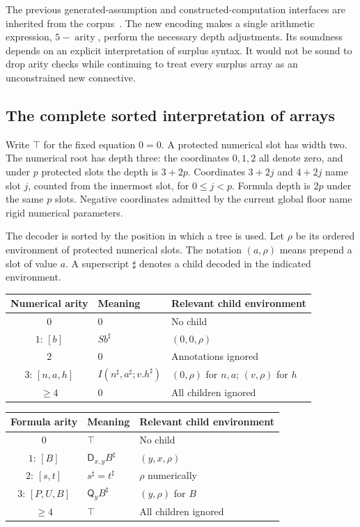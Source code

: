 \documentclass[11pt,letterpaper]{article}
\theoremstyle{definition}\newtheorem{definition}[theorem]{Definition}
\theoremstyle{remark}\newtheorem{remark}[theorem]{Remark}
\newcommand{\D}{\mathsf D}
\newcommand{\Q}{\mathsf Q}
\begin{document}
The previous generated-assumption and constructed-computation interfaces
are inherited from the corpus~\cite{generated,constructed}.  The new
encoding makes a single arithmetic expression, $5-\operatorname{arity}$,
perform the necessary depth adjustments.  Its soundness depends on an
explicit interpretation of surplus syntax.  It would not be sound to
drop arity checks while continuing to treat every surplus array as an
unconstrained new connective.

\subsection{The complete sorted interpretation of arrays}
\label{subsec:sorted-arrays}

Write $\top$ for the fixed equation $0=0$.  A protected numerical slot
has width two.  The numerical root has depth three: the coordinates
$0,1,2$ all denote zero, and under $p$ protected slots the depth is
$3+2p$.  Coordinates $3+2j$ and $4+2j$ name slot $j$, counted from
the innermost slot, for $0\leq j<p$.  Formula depth is $2p$ under the
same $p$ slots.  Negative coordinates admitted by the current global
floor name rigid numerical parameters.

The decoder is sorted by the position in which a tree is used.  Let
$\rho$ be its ordered environment of protected numerical slots.
The notation $(a,\rho)$ means prepend a slot of value $a$.
A superscript $\sharp$ denotes a child decoded in the indicated
environment.

\begin{center}
\begin{tabular}{cll}
\toprule
Numerical arity & Meaning & Relevant child environment\\
\midrule
$0$ & $0$ & No child\\
$1$: $[b]$ & $Sb^\sharp$ & $(0,0,\rho)$\\
$2$ & $0$ & Annotations ignored\\
$3$: $[n,a,h]$ & $I(n^\sharp,a^\sharp;v.h^\sharp)$ & $(0,\rho)$ for $n,a$; $(v,\rho)$ for $h$\\
$\geq4$ & $0$ & All children ignored\\
\bottomrule
\end{tabular}
\end{center}

\begin{center}
\begin{tabular}{cll}
\toprule
Formula arity & Meaning & Relevant child environment\\
\midrule
$0$ & $\top$ & No child\\
$1$: $[B]$ & $\D_{x,y}B^\sharp$ & $(y,x,\rho)$\\
$2$: $[s,t]$ & $s^\sharp=t^\sharp$ & $\rho$ numerically\\
$3$: $[P,U,B]$ & $\Q_yB^\sharp$ & $(y,\rho)$ for $B$\\
$\geq4$ & $\top$ & All children ignored\\
\bottomrule
\end{tabular}
\end{center}
\end{document}
